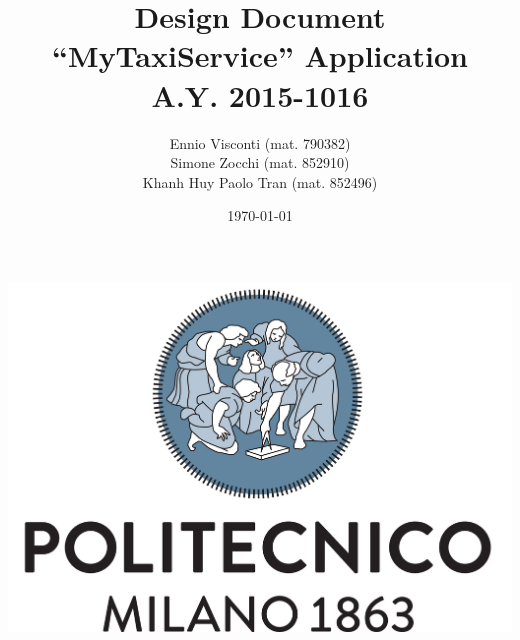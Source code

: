 \documentclass{article}
\title{ \textbf{D}esign \textbf{D}ocument  
\\ ``MyTaxiService'' Application
\\ A.Y. 2015-1016 }
\author{Ennio Visconti (mat. 790382)
\\ Simone Zocchi (mat. 852910)
\\ Khanh Huy Paolo Tran (mat. 852496)}
\date{\today}
\begin{document}
   
    \begin{titlepage}
        \maketitle 
        \vfill
        \centerline{\includegraphics[scale=0.5]{LogoPolimi}}
        \vfill
        \vfill
    \end{titlepage}

        
    \tableofcontents












\end{document}
